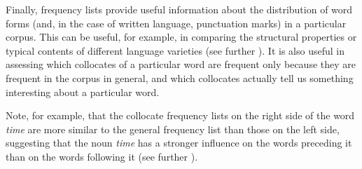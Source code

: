 Finally, frequency  lists provide useful information about the distribution  of word forms (and, in the case of written  language, punctuation marks) in a particular corpus. This can be useful, for example, in comparing the structural properties or typical contents of different language varieties  (see further ). It is also useful in assessing which collocates  of a particular word are frequent only because they are frequent in the corpus in general, and which collocates actually tell us something interesting about a particular word.

\begin{table}
\caption{The forty most frequent strings in the BNC Baby}
\label{tab:bncbabyfrequencies}
\end{table}

Note, for example, that the collocate  frequency  lists on the right side of the word \textit{time} are more similar to the general frequency list than those on the left side, suggesting that the noun  \textit{time} has a stronger influence on the words preceding it than on the words following it (see further ).

